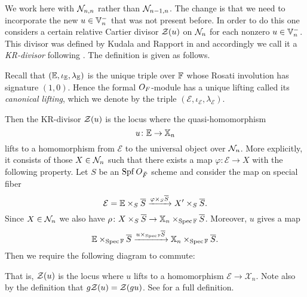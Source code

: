 We work here with $\mathcal N_{n,n}$ rather than $\mathcal N_{n-1,n}$.
The change is that we need to incorporate the new $u \in \mathbb V_n^-$ that was not present before.
In order to do this one considers a certain relative Cartier divisor $\mathcal Z(u)$
on $\mathcal N_n$ for each nonzero $u \in \mathbb V_n^-$.
This divisor was defined by Kudala and Rapport in \cite{ref:KR}
and accordingly we call it a \emph{KR-divisor} following \cite[\S4.3]{ref:survey}.
The definition is given as follows.
\begin{definition}
  Recall that $(\mathbb E, \iota_\mathbb E, \lambda_\mathbb E)$ is the unique triple over $\mathbb F$
  whose Rosati involution has signature $(1,0)$.
  Hence the formal $O_F$-module has a unique lifting called its \emph{canonical lifting},
  which we denote by the triple $(\mathcal{E}, \iota_{\mathcal{E}}, \lambda_{\mathcal E})$.

  Then the KR-divisor $\mathcal Z(u)$ is the locus where the quasi-homomorphism
  \[ u \colon \mathbb E \to \mathbb X_n \]
  lifts to a homomorphism from $\mathcal{E}$ to the universal object over $\mathcal N_n$.
  More explicitly, it consists of those $X \in \mathcal N_n$
  such that there exists a map $\varphi : \mathcal{E} \to X$ with the following property.
  Let $S$ be an $\operatorname{Spf} O_{\breve F}$ scheme and consider the map on special fiber
  \[ \mathcal{E} = \mathbb E \times_S \overline S \xrightarrow{\varphi \times_S \overline S} X' \times_S \overline S. \]
  Since $X \in \mathcal N_n$ we also have $\rho \colon X \times_S \overline S \to \mathbb X_n \times_{\operatorname{Spec} \mathbb F} \overline S$.
  Moreover, $u$ gives a map
  \[
    \mathbb E \times_{\operatorname{Spec} \mathbb F} \overline S
    \xrightarrow{u \times _{\operatorname{Spec} \mathbb F} \overline S}
    \mathbb X_n \times_{\operatorname{Spec} \mathbb F} \overline S.
  \]
  Then we require the following diagram to commute:
  \begin{center}
  \end{center}
\end{definition}
That is, $\mathcal Z(u)$ is the locus where $u$ lifts to a homomorphism $\mathcal{E} \to \mathcal{X}_n$.
Note also by the definition that $g \mathcal Z(u) = \mathcal Z (gu)$.
See \cite{ref:KR} for a full definition.

